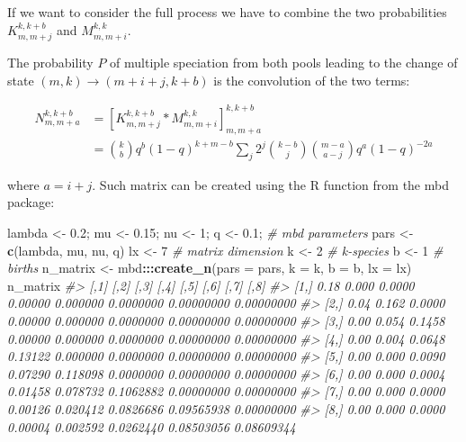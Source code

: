 \documentclass[]{article}
\newenvironment{Shaded}{\begin{snugshade}}{\end{snugshade}}
\newcommand{\CommentTok}[1]{\textcolor[rgb]{0.56,0.35,0.01}{\textit{#1}}}
\newcommand{\DataTypeTok}[1]{\textcolor[rgb]{0.13,0.29,0.53}{#1}}
\newcommand{\DecValTok}[1]{\textcolor[rgb]{0.00,0.00,0.81}{#1}}
\newcommand{\FloatTok}[1]{\textcolor[rgb]{0.00,0.00,0.81}{#1}}
\newcommand{\KeywordTok}[1]{\textcolor[rgb]{0.13,0.29,0.53}{\textbf{#1}}}
\newcommand{\NormalTok}[1]{#1}
\newcommand{\OperatorTok}[1]{\textcolor[rgb]{0.81,0.36,0.00}{\textbf{#1}}}
\newcommand{\StringTok}[1]{\textcolor[rgb]{0.31,0.60,0.02}{#1}}
\begin{document}
If we want to consider the full process we have to combine the two probabilities
\(K^{k, k + b}_{m, m + j}\) and \(M^{k,k}_{m, m + i}\).

The probability \(P\) of multiple speciation from both pools leading to the change
of state \((m,k) \rightarrow (m + i + j, k + b)\) is the convolution of the two
terms:

\[
\begin{aligned}
N^{k, k + b}_{m, m + a} & = [K^{k, k + b}_{m, m + j} * M^{k,k}_{m, m + i}]^{k, k + b}_{m, m + a} \\
& = \binom{k}{b} q ^ b (1 - q) ^ {k + m - b}
\sum_j 2 ^ j \binom{k - b}{j} \binom{m - a} {a - j} q^a (1 - q) ^{-2a}
\label{eq:ndefinition}
\end{aligned}
\]

where \(a = i + j\). Such matrix can be created using the R function from the
mbd package:

\begin{Shaded}
\begin{Highlighting}[]
\NormalTok{lambda <-}\StringTok{ }\FloatTok{0.2}\NormalTok{; mu <-}\StringTok{ }\FloatTok{0.15}\NormalTok{; nu <-}\StringTok{ }\DecValTok{1}\NormalTok{; q <-}\StringTok{ }\FloatTok{0.1}\NormalTok{; }\CommentTok{# mbd parameters}
\NormalTok{pars <-}\StringTok{ }\KeywordTok{c}\NormalTok{(lambda, mu, nu, q)}
\NormalTok{lx <-}\StringTok{ }\DecValTok{7} \CommentTok{# matrix dimension}
\NormalTok{k <-}\StringTok{ }\DecValTok{2} \CommentTok{# k-species}
\NormalTok{b <-}\StringTok{ }\DecValTok{1} \CommentTok{# births}
\NormalTok{n_matrix <-}\StringTok{ }\NormalTok{mbd}\OperatorTok{:::}\KeywordTok{create_n}\NormalTok{(}\DataTypeTok{pars =}\NormalTok{ pars, }\DataTypeTok{k =}\NormalTok{ k, }\DataTypeTok{b =}\NormalTok{ b, }\DataTypeTok{lx =}\NormalTok{ lx)}
\NormalTok{n_matrix}
\CommentTok{#>      [,1]  [,2]   [,3]    [,4]     [,5]      [,6]       [,7]       [,8]}
\CommentTok{#> [1,] 0.18 0.000 0.0000 0.00000 0.000000 0.0000000 0.00000000 0.00000000}
\CommentTok{#> [2,] 0.04 0.162 0.0000 0.00000 0.000000 0.0000000 0.00000000 0.00000000}
\CommentTok{#> [3,] 0.00 0.054 0.1458 0.00000 0.000000 0.0000000 0.00000000 0.00000000}
\CommentTok{#> [4,] 0.00 0.004 0.0648 0.13122 0.000000 0.0000000 0.00000000 0.00000000}
\CommentTok{#> [5,] 0.00 0.000 0.0090 0.07290 0.118098 0.0000000 0.00000000 0.00000000}
\CommentTok{#> [6,] 0.00 0.000 0.0004 0.01458 0.078732 0.1062882 0.00000000 0.00000000}
\CommentTok{#> [7,] 0.00 0.000 0.0000 0.00126 0.020412 0.0826686 0.09565938 0.00000000}
\CommentTok{#> [8,] 0.00 0.000 0.0000 0.00004 0.002592 0.0262440 0.08503056 0.08609344}
\end{Highlighting}
\end{Shaded}
\end{document}
